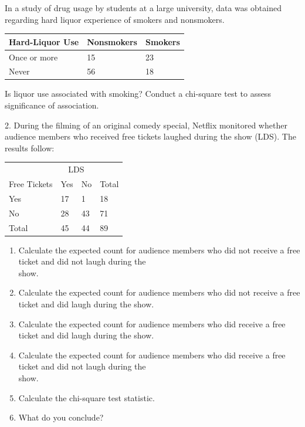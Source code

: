 \documentclass[11pt, chapterprefix=true]{scrbook}\usepackage[]{graphicx}\usepackage[]{color}
\begin{document}
\begin{exercises}

\begin{exercise} %

In a study of drug usage by students at a large university, data was obtained regarding hard liquor experience of smokers and nonsmokers.

\begin{tabular}{@{} lll @{}} \hline
Hard-Liquor Use & Nonsmokers & Smokers \\ \hline
Once or more & 15 & 23 \\
Never        & 56 & 18 \\ \hline
\end{tabular}

Is liquor use associated with smoking?  Conduct a chi-square test to assess significance of association.

\end{exercise}
\begin{solution} %

\end{solution}

\begin{exercise} %

2.	During the filming of an original comedy special, Netflix monitored whether audience members who received free tickets laughed during the show (LDS). The results follow:

\begin{table}[ht]
\centering
\begin{tabular}{@{} llll @{}} \hline
& \multicolumn{2}{c}{LDS} \\
Free Tickets & Yes & No & Total \\ \hline
Yes & 17 & 1  & 18 \\
No  & 28 & 43 & 71  \\ \hline
Total & 45 & 44 & 89 \\ \hline
\end{tabular}
\end{table}

\begin{enumerate}
  \item Calculate the expected count for audience members who did not receive a free ticket and did not laugh during the \\ show.
  \item Calculate the expected count for audience members who did not receive a free ticket and did laugh during the show.
  \item Calculate the expected count for audience members who did receive a free \\ ticket and did laugh during the show.
  \item Calculate the expected count for audience members who did receive a free \\ ticket and did not laugh during the \\ show.
  \item Calculate the chi-square test statistic.
  \item What do you conclude?
\end{enumerate}


\end{exercise}
\end{exercises}
\end{document}
